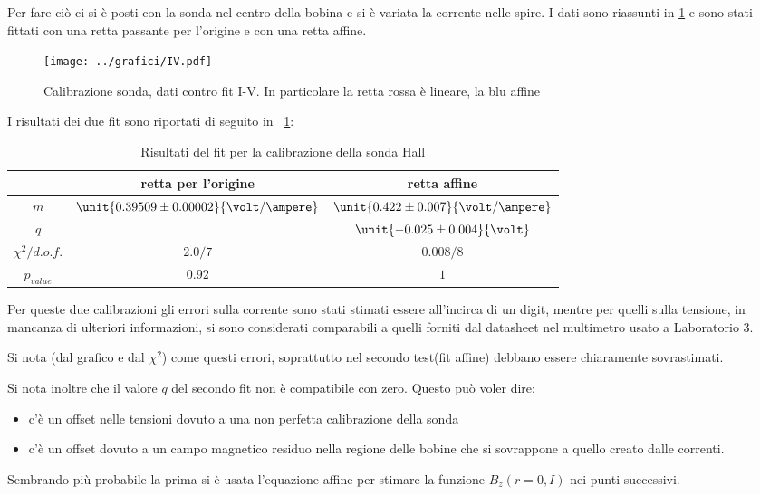 \documentclass[10pt,a4paper]{article}
\begin{document}
Per fare ciò ci si è posti con la sonda nel centro della bobina e si è variata la corrente nelle spire. I dati sono riassunti in \figurename{\ref{fig:Hallcal}} e sono stati fittati con una retta passante per l'origine e con una retta affine. 

\begin{figure}[H]
	\centering
	\texttt{[image: ../grafici/IV.pdf]}
	\caption{Calibrazione sonda, dati contro fit I-V. In particolare la retta rossa è lineare, la blu affine}
	\label{fig:Hallcal}
\end{figure}

I risultati dei due fit sono riportati di seguito in \tablename{~\ref{tab:Hallcal}}:

\begin{table}[H]
	\centering
	\begin{tabular}{c|c|c}
			& retta per l'origine & retta affine\\
		\hline
		$m$ & $\unit{0.39509 \pm 0.00002}{\volt/\ampere}$ & $\unit{0.422 \pm 0.007}{\volt/\ampere}$ \\
		$q$ & \ & $\unit{-0.025 \pm 0.004}{\volt}$\\
		$\chi^2/d.o.f.$ & $2.0/7$ & $0.008/8$ \\
		$p_{value}$ & $0.92$ & $1$\\
	\end{tabular}
	\caption{Risultati del fit per la calibrazione della sonda Hall}
	\label{tab:Hallcal}
\end{table}

Per queste due calibrazioni gli errori sulla corrente sono stati stimati essere all'incirca di un digit, mentre per quelli sulla tensione, in mancanza di ulteriori informazioni, si sono considerati comparabili a quelli forniti dal datasheet nel multimetro usato a Laboratorio 3.

Si nota (dal grafico e dal $\chi^2$) come questi errori, soprattutto nel secondo test(fit affine) debbano essere chiaramente sovrastimati.


Si nota inoltre che il valore $q$ del secondo fit non è compatibile con zero. Questo può voler dire:
\begin{itemize}
\item c'è un offset nelle tensioni dovuto a una non perfetta calibrazione della sonda
\item c'è un offset dovuto a un campo magnetico residuo nella regione delle bobine che si sovrappone a quello creato dalle correnti.
\end{itemize}
Sembrando più probabile la prima si è usata l'equazione affine per stimare la funzione $B_z(r=0, I)$ nei punti successivi.
\end{document}
